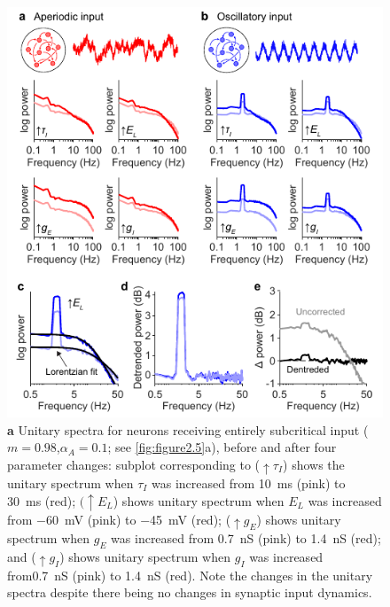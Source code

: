 \begin{figure}
  \begin{minipage}[c]{90mm}
    \includegraphics[width=\textwidth]{Figures/chapter2/figure7.pdf}
  \end{minipage}\hfill
  \begin{minipage}[c]{70mm}
    \vspace*{0.25cm}
    \caption{
	\textbf{a} Unitary spectra for neurons receiving entirely subcritical input ($m=0.98$,$\alpha_A=0.1$; see \autoref{fig:figure2.5}a), before and after four parameter changes: subplot corresponding to ($\uparrow\tau_I$) shows the unitary spectrum when $\tau_I$  was increased from \qty{10}{\milli\second} (pink) to \qty{30}{\milli\second} (red); $(\uparrow E_L$) shows unitary spectrum when $E_L$ was increased from \qty{-60}{\milli\volt} (pink) to \qty{-45}{\milli\volt} (red); ($\uparrow g_E$) shows unitary spectrum when $g_E$ was increased from \qty{0.7}{\nano\siemens} (pink) to \qty{1.4}{\nano\siemens} (red); and ($\uparrow g_I$) shows unitary spectrum when $g_I$ was increased from\qty{0.7}{\nano\siemens} (pink) to \qty{1.4}{\nano\siemens} (red). Note the changes in the unitary spectra despite there being no changes in synaptic input dynamics.
}
\end{minipage}
\end{figure}
